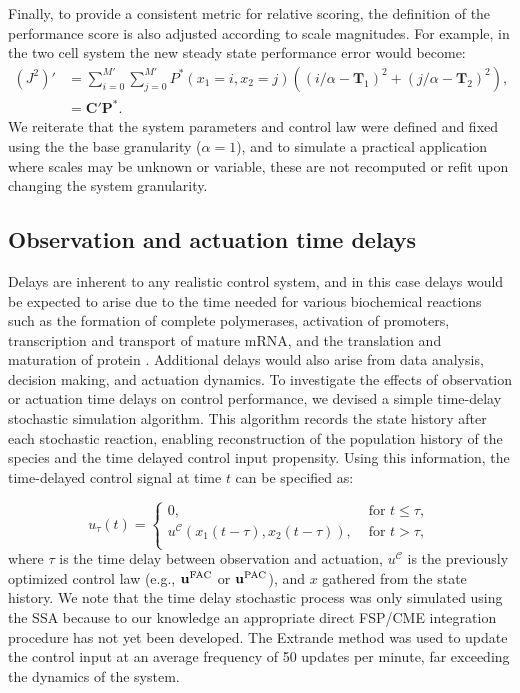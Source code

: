 \documentclass[12pt]{iopart}
\begin{document}
Finally, to provide a consistent metric for relative scoring, the definition of the performance score is also adjusted according to scale magnitudes. For example, in the two cell system the new steady state performance error would become:
\begin{eqnarray}
(J^2)' &= \sum_{i=0}^{M'}  \sum_{j=0}^{M'}P^*(x_1=i,x_2=j) ((i/\alpha - \mathbf T_1)^2 + (j/\alpha -\mathbf T_2)^2),\nonumber \\
& =\mathbf{C}'\mathbf{P}^*.
\label{EuclidV}
\end{eqnarray}
We reiterate that the system parameters and control law were defined and fixed using the the base granularity ($\alpha=1$), and to simulate a practical application where scales may be unknown or variable, these are not recomputed or refit upon changing the system granularity.

\subsection{Observation and actuation time delays}\label{sec:Delay}

Delays are inherent to any realistic control system, and in this case delays would be expected to arise due to the time needed for various biochemical reactions such as the formation of complete polymerases, activation of promoters, transcription and transport of mature mRNA, and the translation and maturation of protein \cite{Cai2007}. 
Additional delays would also arise from data analysis, decision making, and actuation dynamics. 
To investigate the effects of observation or actuation time delays on control performance, we devised a simple time-delay stochastic simulation algorithm. 
This algorithm records the state history after each stochastic reaction, enabling reconstruction of the population history of the species and the time delayed control input propensity.  
Using this information, the time-delayed control signal at time $t$ can be specified as: 

\begin{equation}
u_{\tau}(t)=\left\{
\begin{array}{rl}
      0 ,&\textrm{ for }  t \leq \tau, \\
      {u}^{\mathcal{C}}(x_1(t-\tau), x_2(t-\tau)) , &\textrm{ for }   t > \tau,\\
\end{array}\right. 
\label{timeDelaySSA}
\end{equation}
where $\tau$ is the time delay between observation and actuation, ${u}^{\mathcal{C}}$ is the previously optimized control law (e.g., $\mathbf{u}^{\rm FAC}$ or $\mathbf{u}^{\rm PAC}$), and $x$ gathered from the state history. 
We note that the time delay stochastic process was only simulated using the SSA because to our knowledge an appropriate direct FSP/CME integration procedure has not yet been developed. The Extrande method \cite{Voliotis2016} was used to update the control input at an average frequency of 50 updates per minute, far exceeding the dynamics of the system.
\end{document}
